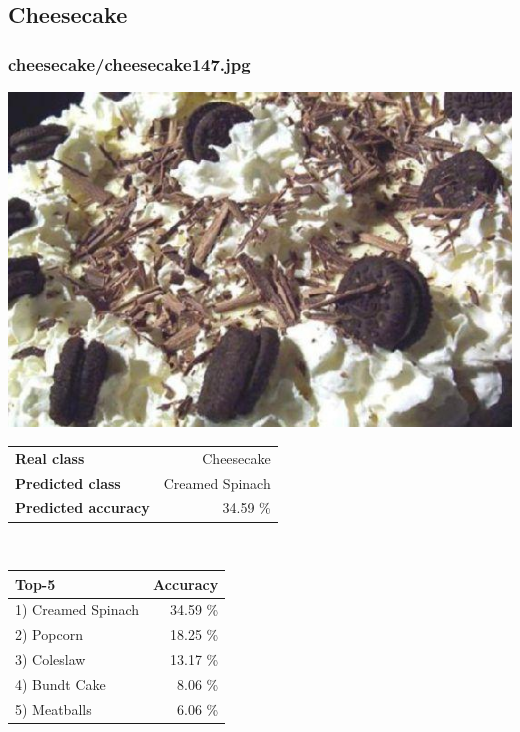 \subsection{Cheesecake}
    
\subsubsection{cheesecake/cheesecake147.jpg}

\begin{minipage}[t]{0.4\textwidth}
	\vspace{0pt}
	\includegraphics[width=\linewidth]{images/evaluation-images/cheesecake/cheesecake147.jpg}
\end{minipage}
\hfill
\begin{minipage}[t]{0.5\textwidth}
	\vspace{0pt}\raggedright
	\begin{tabularx}{\textwidth}{X r}
		\small \textbf{Real class} & \small Cheesecake\\
		\small \textbf{Predicted class} & \small Creamed Spinach\\
		\small \textbf{Predicted accuracy} & \small 34.59 \%
    \end{tabularx}\\
    
    \vspace{6pt}
	\begin{tabularx}{\textwidth}{X r}
        \small \textbf{Top-5} & \small \textbf{Accuracy} \\
        \hline
		\small 1) Creamed Spinach & \small 34.59 \%\\\small 2) Popcorn & \small 18.25 \%\\\small 3) Coleslaw & \small 13.17 \%\\\small 4) Bundt Cake & \small 8.06 \%\\\small 5) Meatballs & \small 6.06 \%
    \end{tabularx}
\end{minipage}
    
